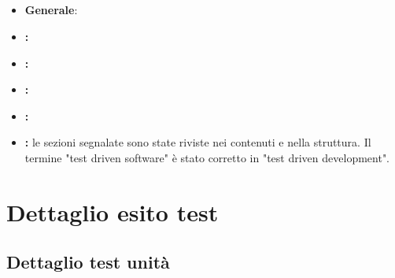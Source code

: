\documentclass[12pt,a4paper]{article}
\begin{document}
	\subsection{\RP{}}
	\begin{itemize}
		\item \textbf{Generale}:
		\item \textbf{\AdR{}:}
		\item \textbf{\DP{}:}
	    \item \textbf{\NdP{}:}
	    \item \textbf{\PdP{}:}
	    \item \textbf{\PdQ{}:} le sezioni segnalate sono state riviste nei contenuti e nella struttura. Il termine "test driven software" è stato corretto in "test driven development".
	\end{itemize}
	
	\section{Dettaglio esito test}
	\subsection{Dettaglio test unità}
	
	
\end{document}
